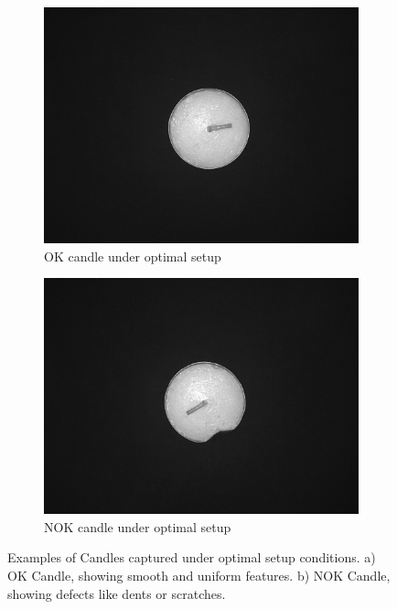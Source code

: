 \documentclass[12pt,DIV14,BCOR12mm,a4paper,footinclude=false,headinclude,parskip=half-,twoside,openright,cleardoublepage=empty,toc=index,bibliography=totoc,listof=totoc]{scrreprt}
\numberwithin{equation}{chapter}
\begin{document}
\begin{figure}
    \centering
    \begin{subfigure}[b]{0.45\textwidth}
        \centering
        \includegraphics[scale=0.15]{../media/Candles-optimal-OK.png}
        \caption{OK candle under optimal setup}
        \label{fig:candle_ok}
    \end{subfigure}
    \hfill
    \begin{subfigure}[b]{0.45\textwidth}
        \centering
        \includegraphics[scale=0.15]{../media/Candles-optimal-NOK.png}
        \caption{NOK candle under optimal setup}
        \label{fig:candle_nok}
    \end{subfigure}
    \caption{Examples of Candles captured under optimal setup conditions. a) OK Candle, showing smooth and uniform features. b) NOK Candle, showing defects like dents or scratches.}
    \label{fig:optimal_setup_candles}
\end{figure}
\end{document}
